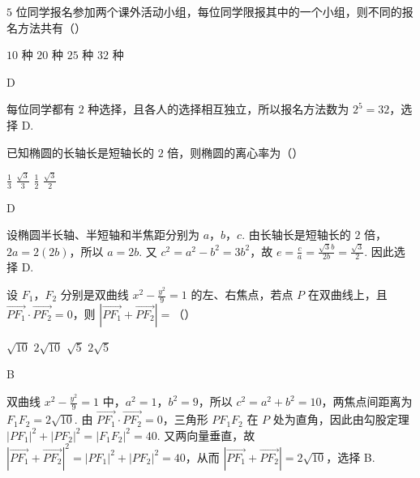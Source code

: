 \begin{problem}
\(5\) 位同学报名参加两个课外活动小组，每位同学限报其中的一个小组，则不同的报名方法共有（\quad）

\choices
    {\(10\text{ 种}\)}
    {\(20\text{ 种}\)}
    {\(25\text{ 种}\)}
    {\(32\text{ 种}\)}
\end{problem}

\begin{answer}
D
\end{answer}

\begin{solution}
每位同学都有 \(2\) 种选择，且各人的选择相互独立，所以报名方法数为
\(2^5=32\)，选择 D.
\end{solution}

\begin{problem}
已知椭圆的长轴长是短轴长的 \(2\) 倍，则椭圆的离心率为（\quad）

\choices
    {\(\frac{1}{3}\)}
    {\(\frac{\sqrt{3}}{3}\)}
    {\(\frac{1}{2}\)}
    {\(\frac{\sqrt{3}}{2}\)}
\end{problem}

\begin{answer}
D
\end{answer}

\begin{solution}
设椭圆半长轴、半短轴和半焦距分别为 \(a\)，\(b\)，\(c\). 由长轴长是短轴长的 \(2\) 倍，
\(2a=2(2b)\)，所以 \(a=2b\). 又
\(c^2=a^2-b^2=3b^2\)，故
\(e=\frac{c}{a}=\frac{\sqrt{3}b}{2b}=\frac{\sqrt{3}}{2}\).
因此选择 D.
\end{solution}

\begin{problem}
设 \(F_1\)，\(F_2\) 分别是双曲线 \(x^2-\frac{y^2}{9}=1\) 的左、右焦点，若点 \(P\) 在双曲线上，且 \(\overrightarrow{PF_1}\cdot\overrightarrow{PF_2}=0\)，则 \(\left|\overrightarrow{PF_1}+\overrightarrow{PF_2}\right|=\)（\quad）

\choices
    {\(\sqrt{10}\)}
    {\(2\sqrt{10}\)}
    {\(\sqrt{5}\)}
    {\(2\sqrt{5}\)}
\end{problem}

\begin{answer}
B
\end{answer}

\begin{solution}
双曲线 \(x^2-\frac{y^2}{9}=1\) 中，\(a^2=1\)，\(b^2=9\)，所以
\(c^2=a^2+b^2=10\)，两焦点间距离为 \(F_1F_2=2\sqrt{10}\).
由 \(\overrightarrow{PF_1}\cdot\overrightarrow{PF_2}=0\)，三角形
\(PF_1F_2\) 在 \(P\) 处为直角，因此由勾股定理
\(|PF_1|^2+|PF_2|^2=|F_1F_2|^2=40\).
又两向量垂直，故
\(\left|\overrightarrow{PF_1}+\overrightarrow{PF_2}\right|^2
=|PF_1|^2+|PF_2|^2=40\)，从而
\(\left|\overrightarrow{PF_1}+\overrightarrow{PF_2}\right|=2\sqrt{10}\)，选择 B.
\end{solution}

